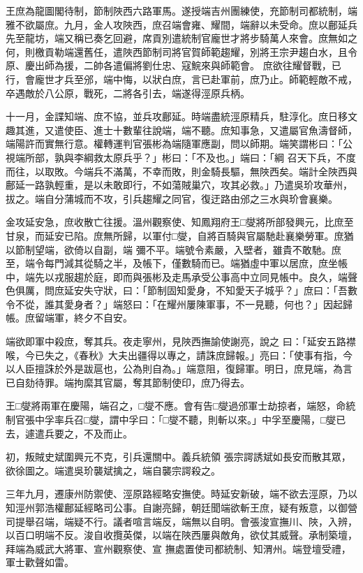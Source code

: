 \begin{pinyinscope}
 王庶為龍圖閣待制，節制陜西六路軍馬。遂授端吉州團練使，充節制司都統制，端雅不欲屬庶。九月，金人攻陜西，庶召端會雍、耀間，端辭以未受命。庶以鄜延兵先至龍坊，端又稱已奏乞回避，席貢別遣統制官龐世才將步騎萬人來會。庶無如之何，則檄貢勒端還舊任，遣陜西節制司將官賀師範趨耀，別將王宗尹趨白水，且令原、慶出師為援，二帥各遣偏將劉仕忠、寇鯇來與師範會。
 庶欲往耀督戰，已行，會龐世才兵至邠，端中悔，以狀白庶，言已赴軍前，庶乃止。師範輕敵不戒，卒遇敵於八公原，戰死，二將各引去，端遂得涇原兵柄。



 十一月，金諜知端、庶不協，並兵攻鄜延。時端盡統涇原精兵，駐淳化。庶日移文趣其進，又遣使臣、進士十數輩往說端，端不聽。庶知事急，又遣屬官魚濤督師，端陽許而實無行意。權轉運判官張彬為端隨軍應副，問以師期。端笑謂彬曰：「公視端所部，孰與李綱救太原兵乎？」彬曰：「不及也。」端曰：「綱
 召天下兵，不度而往，以取敗。今端兵不滿萬，不幸而敗，則金騎長驅，無陜西矣。端計全陜西與鄜延一路孰輕重，是以未敢即行，不如蕩賊巢穴，攻其必救。」乃遣吳玠攻華州，拔之。端自分蒲城而不攻，引兵趨耀之同官，復迂路由邠之三水與玠會襄樂。



 金攻延安急，庶收散亡往援。溫州觀察使、知鳳翔府王□燮將所部發興元，比庶至甘泉，而延安已陷。庶無所歸，以軍付□燮，自將百騎與官屬馳赴襄樂勞軍。庶猶以節制望端，欲倚以自副，端
 彌不平。端號令素嚴，入壁者，雖貴不敢馳。庶至，端令每門減其從騎之半，及帳下，僅數騎而已。端猶虛中軍以居庶，庶坐帳中，端先以戎服趨於庭，即而與張彬及走馬承受公事高中立同見帳中。良久，端聲色俱厲，問庶延安失守狀，曰：「節制固知愛身，不知愛天子城乎？」庶曰：「吾數令不從，誰其愛身者？」端怒曰：「在耀州屢陳軍事，不一見聽，何也？」因起歸帳。庶留端軍，終夕不自安。



 端欲即軍中殺庶，奪其兵。夜走寧州，見陜西撫諭使謝亮，說之
 曰：「延安五路襟喉，今已失之，《春秋》大夫出疆得以專之，請誅庶歸報。」亮曰：「使事有指，今以人臣擅誅於外是跋扈也，公為則自為。」端意阻，復歸軍。明日，庶見端，為言已自劾待罪。端拘縻其官屬，奪其節制使印，庶乃得去。



 王□燮將兩軍在慶陽，端召之，□燮不應。會有告□燮過邠軍士劫掠者，端怒，命統制官張中孚率兵召□燮，謂中孚曰：「□燮不聽，則斬以來。」中孚至慶陽，□燮已去，遽遣兵要之，不及而止。



 初，叛賊史斌圍興元不克，引兵還關中。義兵統領
 張宗諤誘斌如長安而散其眾，欲徐圖之。端遣吳玠襲斌擒之，端自襲宗諤殺之。



 三年九月，遷康州防禦使、涇原路經略安撫使。時延安新破，端不欲去涇原，乃以知涇州郭浩權鄜延經略司公事。自謝亮歸，朝廷聞端欲斬王庶，疑有叛意，以御營司提舉召端，端疑不行。議者喧言端反，端無以自明。會張浚宣撫川、陜，入辨，以百口明端不反。浚自收攬英傑，以端在陜西屢與敵角，欲仗其威聲。承制築壇，拜端為威武大將軍、宣州觀察使、宣
 撫處置使司都統制、知渭州。端登壇受禮，軍士歡聲如雷。




\end{pinyinscope}
